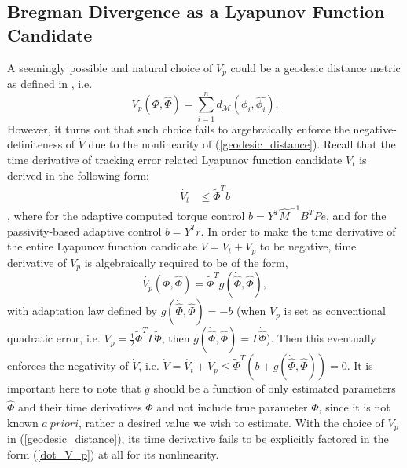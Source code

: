 \documentclass[letterpaper, 10 pt, conference]{ieeeconf}  %
\begin{document}
\subsection{Bregman Divergence as a Lyapunov Function Candidate}
A seemingly possible and natural choice of $V_{p}$ could be a geodesic distance metric as defined in \cite{Taeyoon_RAL}, i.e. 
\begin{equation}
V_{p}(\Phi,\hat{\Phi}) = \sum_{i=1}^{n} d_{\mathcal{M}}(\phi_{i}, \hat{\phi_{i}}). \label{geodesic_distance}
\end{equation}
However, it turns out that such choice fails to argebraically enforce the negative-definiteness of $\dot{V}$ due to the nonlinearity of (\ref{geodesic_distance}). Recall that the time derivative of tracking error related Lyapunov function candidate $V_{t}$ is derived in the following form:
\begin{align}
\dot{V_t} &\leq \tilde{\Phi}^{T}b \label{dot_V_t}
\end{align}
, where for the adaptive computed torque control $b = Y^T\hat{M}^{-1}B^{T}Pe$, and for the passivity-based adaptive control $b = Y^{T}r$. In order to make the time derivative of the entire Lyapunov function candidate $V = V_{t}+V_{p}$ to be negative, time derivative of $V_{p}$ is algebraically required to be of the form,
\begin{equation}
\dot{V_{p}}(\Phi, \hat{\Phi})=\tilde{\Phi}^{T}g(\dot{\hat{\Phi}}, \hat{\Phi}) \label{dot_V_p},
\end{equation}
with adaptation law defined by $g(\dot{\hat{\Phi}}, \hat{\Phi}) = - b$ (when $V_{p}$ is set as conventional quadratic error, i.e. $V_{p} = \frac{1}{2}\tilde{\Phi}^{T}\Gamma\tilde{\Phi}$, then $g(\dot{\hat{\Phi}}, \hat{\Phi}) = \Gamma \dot{\hat{\Phi}}$). Then this eventually enforces the negativity of $\dot{V}$, i.e. $\dot{V} =\dot{V_{t}}+\dot{V_{p}}\leq \tilde{\Phi}^{T}(b + g(\dot{\hat{\Phi}},\hat{\Phi})) = 0$. It is important here to note that $g$ should be a function of only estimated parameters $\hat{\Phi}$ and their time derivatives $\dot{\hat{\Phi}}$ and not include true parameter $\Phi$, since it is not known $a \ priori$, rather a desired value we wish to estimate. With the choice of $V_{p}$ in (\ref{geodesic_distance}), its time derivative fails to be explicitly factored in the form (\ref{dot_V_p}) at all for its nonlinearity.
\end{document}
